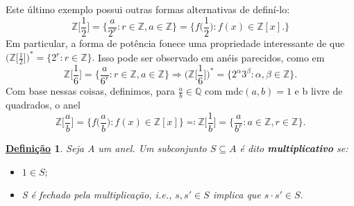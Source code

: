\documentclass{article}
\newtheorem*{def*}{\underline{Defini\c c\~ao}}
\begin{document}
    Este último exemplo possui outras formas alternativas de definí-lo:
    \[
      \mathbb{Z}\biggl[\frac{1}{2}\biggr] = \biggl\{\frac{a}{2^{r}}: r\in \mathbb{Z}, a\in \mathbb{Z}\biggr\} = \biggl\{f \biggl(\frac{1}{2}\biggr): f(x)\in \mathbb{Z}[x].\biggr\}
    \]
    Em particular, a forma de potência fonece uma propriedade interessante de que \(\biggl(\mathbb{Z}\biggl[\frac{1}{2}\biggr]\biggr)^{*} = \{2^{r}: r\in \mathbb{Z}\}.\) Isso pode ser observado
    em anéis parecidos, como em 
    \[
      \mathbb{Z}\biggl[\frac{1}{6}\biggr] = \biggl\{\frac{a}{6^{r}}: r\in \mathbb{Z}, a\in \mathbb{Z}\biggr\} \Rightarrow \biggl(\mathbb{Z}\biggl[\frac{1}{6}\biggr]\biggr)^{*}=\{2^{\alpha }3^{\beta }:\alpha , \beta \in \mathbb{Z}\}.
    \]
    Com base nessas coisas, definimos, para \(\frac{a}{b}\in \mathbb{Q}\) com \(\mathrm{mdc}(a, b) = 1\) e b livre de quadrados, o anel 
    \[
      \mathbb{Z}\biggl[\frac{a}{b}\biggr] = \biggl\{f \biggl(\frac{a}{b}\biggr): f(x)\in \mathbb{Z}[x]\biggr\} \eqqcolon \mathbb{Z}\biggl[\frac{1}{b}\biggr] = \biggl\{\frac{a}{b^{r}}: a\in \mathbb{Z}, r\in \mathbb{Z}\biggr\}.
    \]
    \begin{def*}
      Seja A um anel. Um subconjunto \(S\subseteq A\) é dito \textbf{multiplicativo} se:
      \begin{itemize}
        \item[1)] \(1\in S;\)
        \item[2)] S é fechado pela multiplicação, i.e., \(s, s'\in S\) implica que \(s \cdot s'\in S.\)
      \end{itemize}
    \end{def*}
\end{document}
